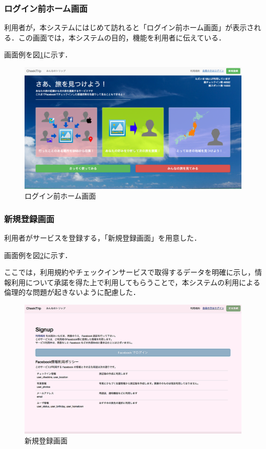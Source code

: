 \documentclass{jsarticle}
\begin{document}
\subsubsection{ログイン前ホーム画面}

利用者が，本システムにはじめて訪れると「ログイン前ホーム画面」が表示される．この画面では，本システムの目的，機能を利用者に伝えている．

画面例を図\ref{screen_home_before_login}に示す．

\begin{figure}[!ht]
\begin{center}
\includegraphics[width=12.0cm]{./image/cheektrip_top_before_login.png}
\caption{ログイン前ホーム画面}
\label{screen_home_before_login}
\end{center}
\end{figure}

\subsubsection{新規登録画面}

利用者がサービスを登録する，「新規登録画面」を用意した．

画面例を図\ref{screen_signup}に示す．

ここでは，利用規約やチェックインサービスで取得するデータを明確に示し，情報利用について承諾を得た上で利用してもらうことで，本システムの利用による倫理的な問題が起きないように配慮した．

\begin{figure}[!ht]
\begin{center}
\includegraphics[width=15.0cm]{./image/cheekitrip_signup.png}
\caption{新規登録画面}
\label{screen_signup}
\end{center}
\end{figure}
\end{document}

